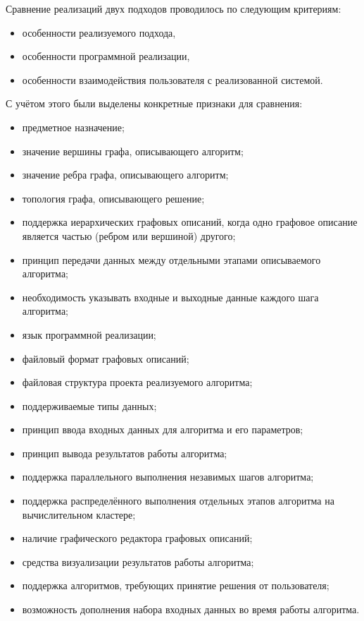 Сравнение реализаций двух подходов проводилось по следующим критериям:
\begin{itemize}
    \item особенности реализуемого подхода,
    \item особенности программной реализации,
    \item особенности взаимодействия пользователя с реализованной системой.
\end{itemize}
С учётом этого были выделены конкретные признаки для сравнения:
\begin{itemize}
    \item предметное назначение;
    \item значение вершины графа, описывающего алгоритм;
    \item значение ребра графа, описывающего алгоритм;
    \item топология графа, описывающего решение;
    \item поддержка иерархических графовых описаний, когда одно графовое описание является частью (ребром или вершиной) другого;
    \item принцип передачи данных между отдельными этапами описываемого алгоритма;
    \item необходимость указывать входные и выходные данные каждого шага алгоритма;
    \item язык программной реализации;
    \item файловый формат графовых описаний;
    \item файловая структура проекта реализуемого алгоритма;
    \item поддерживаемые типы данных;
    \item принцип ввода входных данных для алгоритма и его параметров;
    \item принцип вывода результатов работы алгоритма;
    \item поддержка параллельного выполнения незавимых шагов алгоритма;
    \item поддержка распределённого выполнения отдельных этапов алгоритма на вычислительном кластере;
    \item наличие графического редактора графовых описаний;
    \item средства визуализации результатов работы алгоритма;
    \item поддержка алгоритмов, требующих принятие решения от пользователя;
    \item возможность дополнения набора входных данных во время работы алгоритма.
\end{itemize}

